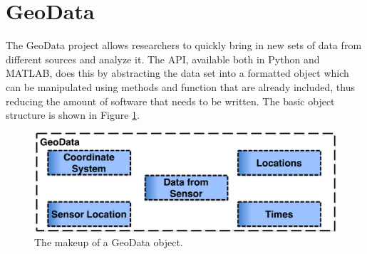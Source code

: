 
\section{GeoData}

The GeoData project allows researchers to quickly bring in new sets of data from different sources and analyze it. The API, available both in Python and MATLAB, does this by abstracting the data set into a formatted object which can be manipulated using methods and function that are already included, thus reducing the amount of software that needs to be written. The basic object structure is shown in Figure \ref{fig:objdiag}.

\begin{figure}[h!]
\centering
\includegraphics[width=6.0in]{geodatadiagram}
\caption{The makeup of a GeoData object.}
\label{fig:objdiag}
\end{figure}

